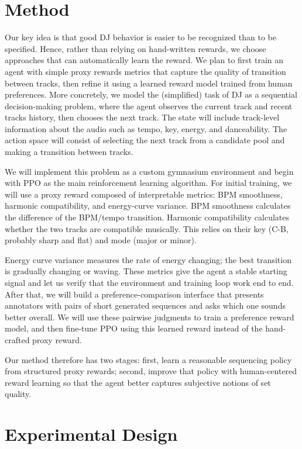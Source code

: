 \documentclass{article}
\begin{document}
\section{Method}

Our key idea is that good DJ behavior is easier to be recognized than to be specified. Hence, rather than relying on hand-written rewards, we choose approaches that can automatically learn the reward. We plan to first train an agent with simple proxy rewards metrics that capture the quality of transition between tracks, then refine it using a learned reward model trained from human preferences. More concretely, we model the (simplified) task of DJ as a sequential decision-making problem, where the agent observes the current track and recent tracks history, then chooses the next track. The state will include track-level information about the audio such as tempo, key, energy, and danceability. The action space will consist of selecting the next track from a candidate pool and making a transition between tracks.

We will implement this problem as a custom gymnasium environment and begin with PPO as the main reinforcement learning algorithm. For initial training, we will use a proxy reward composed of interpretable metrics: BPM smoothness, harmonic compatibility, and energy-curve variance. BPM smoothness calculates the difference of the BPM/tempo transition. Harmonic compatibility calculates whether the two tracks are compatible musically. This relies on their key (C-B, probably sharp and flat) and mode (major or minor).

Energy curve variance measures the rate of energy changing; the best transition is gradually changing or waving. These metrics give the agent a stable starting signal and let us verify that the environment and training loop work end to end. After that, we will build a preference-comparison interface that presents annotators with pairs of short generated sequences and asks which one sounds better overall. We will use these pairwise judgments to train a preference reward model, and then fine-tune PPO using this learned reward instead of the hand-crafted proxy reward.

Our method therefore has two stages: first, learn a reasonable sequencing policy from structured proxy rewards; second, improve that policy with human-centered reward learning so that the agent better captures subjective notions of set quality.

\section{Experimental Design}
\end{document}
